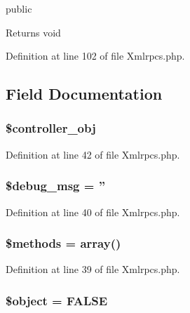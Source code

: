 public \begin{DoxyReturn}{Returns}
void 
\end{DoxyReturn}


Definition at line 102 of file Xmlrpcs.\-php.



\subsection{Field Documentation}
\hypertarget{class_c_i___xmlrpcs_a8055a428b1f8d9ceed3620204745a6d8}{
\subsubsection[{\$controller\-\_\-obj}]{\setlength{\rightskip}{0pt plus 5cm}\$controller\-\_\-obj}}\label{class_c_i___xmlrpcs_a8055a428b1f8d9ceed3620204745a6d8}


Definition at line 42 of file Xmlrpcs.\-php.

\hypertarget{class_c_i___xmlrpcs_afed2f9c39f2e406bcdff222ce412bda8}{
\subsubsection[{\$debug\-\_\-msg}]{\setlength{\rightskip}{0pt plus 5cm}\$debug\-\_\-msg = ''}}\label{class_c_i___xmlrpcs_afed2f9c39f2e406bcdff222ce412bda8}


Definition at line 40 of file Xmlrpcs.\-php.

\hypertarget{class_c_i___xmlrpcs_a802753499268a04da139bd6e6ef89b35}{
\subsubsection[{\$methods}]{\setlength{\rightskip}{0pt plus 5cm}\$methods = array()}}\label{class_c_i___xmlrpcs_a802753499268a04da139bd6e6ef89b35}


Definition at line 39 of file Xmlrpcs.\-php.

\hypertarget{class_c_i___xmlrpcs_a52123b83a1952a68c5513e47d59ec4a6}{
\subsubsection[{\$object}]{\setlength{\rightskip}{0pt plus 5cm}\$object = F\-A\-L\-S\-E}}\label{class_c_i___xmlrpcs_a52123b83a1952a68c5513e47d59ec4a6}


